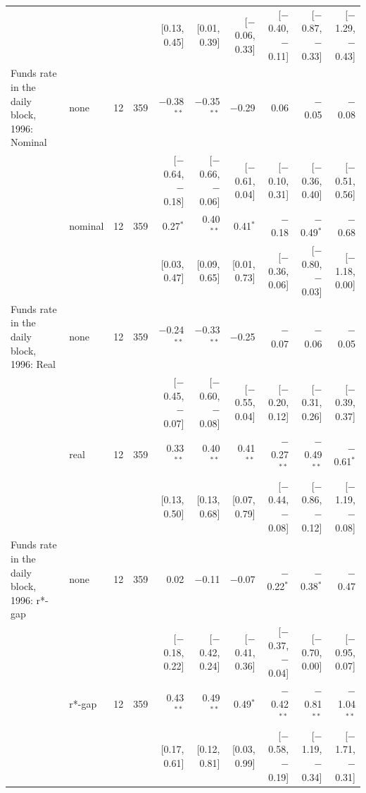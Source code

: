 \begin{table}[tp]
{\begin{tabular}{llcrrrrrrr}
 & & & & {\scriptsize [0.13, 0.45]} & {\scriptsize [0.01, 0.39]} & {\scriptsize [$-$0.06, 0.33]} & {\scriptsize [$-$0.40, $-$0.11]} & {\scriptsize [$-$0.87, $-$0.33]} & {\scriptsize [$-$1.29, $-$0.43]}\\
\addlinespace
Funds rate in the daily block, 1996: Nominal & none & 12 & 359 & $-$0.38$^{**}$ & $-$0.35$^{**}$ & $-$0.29 & 0.06 & $-$0.05 & $-$0.08\\
 & & & & {\scriptsize [$-$0.64, $-$0.18]} & {\scriptsize [$-$0.66, $-$0.06]} & {\scriptsize [$-$0.61, 0.04]} & {\scriptsize [$-$0.10, 0.31]} & {\scriptsize [$-$0.36, 0.40]} & {\scriptsize [$-$0.51, 0.56]}\\
 & nominal & 12 & 359 & 0.27$^{*}$ & 0.40$^{**}$ & 0.41$^{*}$ & $-$0.18 & $-$0.49$^{*}$ & $-$0.68\\
 & & & & {\scriptsize [0.03, 0.47]} & {\scriptsize [0.09, 0.65]} & {\scriptsize [0.01, 0.73]} & {\scriptsize [$-$0.36, 0.06]} & {\scriptsize [$-$0.80, $-$0.03]} & {\scriptsize [$-$1.18, 0.00]}\\
\addlinespace
Funds rate in the daily block, 1996: Real & none & 12 & 359 & $-$0.24$^{**}$ & $-$0.33$^{**}$ & $-$0.25 & $-$0.07 & $-$0.06 & $-$0.05\\
 & & & & {\scriptsize [$-$0.45, $-$0.07]} & {\scriptsize [$-$0.60, $-$0.08]} & {\scriptsize [$-$0.55, 0.04]} & {\scriptsize [$-$0.20, 0.12]} & {\scriptsize [$-$0.31, 0.26]} & {\scriptsize [$-$0.39, 0.37]}\\
 & real & 12 & 359 & 0.33$^{**}$ & 0.40$^{**}$ & 0.41$^{**}$ & $-$0.27$^{**}$ & $-$0.49$^{**}$ & $-$0.61$^{*}$\\
 & & & & {\scriptsize [0.13, 0.50]} & {\scriptsize [0.13, 0.68]} & {\scriptsize [0.07, 0.79]} & {\scriptsize [$-$0.44, $-$0.08]} & {\scriptsize [$-$0.86, $-$0.12]} & {\scriptsize [$-$1.19, $-$0.08]}\\
\addlinespace
Funds rate in the daily block, 1996: r*-gap & none & 12 & 359 & 0.02 & $-$0.11 & $-$0.07 & $-$0.22$^{*}$ & $-$0.38$^{*}$ & $-$0.47\\
 & & & & {\scriptsize [$-$0.18, 0.22]} & {\scriptsize [$-$0.42, 0.24]} & {\scriptsize [$-$0.41, 0.36]} & {\scriptsize [$-$0.37, $-$0.04]} & {\scriptsize [$-$0.70, 0.00]} & {\scriptsize [$-$0.95, 0.07]}\\
 & r*-gap & 12 & 359 & 0.43$^{**}$ & 0.49$^{**}$ & 0.49$^{*}$ & $-$0.42$^{**}$ & $-$0.81$^{**}$ & $-$1.04$^{**}$\\
 & & & & {\scriptsize [0.17, 0.61]} & {\scriptsize [0.12, 0.81]} & {\scriptsize [0.03, 0.99]} & {\scriptsize [$-$0.58, $-$0.19]} & {\scriptsize [$-$1.19, $-$0.34]} & {\scriptsize [$-$1.71, $-$0.31]}\\

\end{tabular}}
\end{table}
